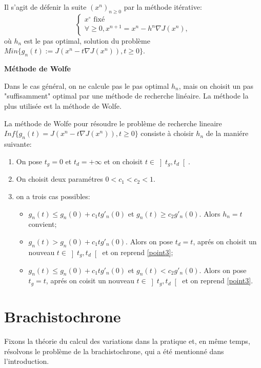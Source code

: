 \documentclass[10pt,a4paper]{article}%
\theoremstyle{theorem}
\theoremstyle{definition}
\begin{document}
			Il s'agit de défenir la suite $(x^n)_{n \ge 0}$ par la méthode itérative:
				\begin{equation}
					\begin{cases*}
						x^\circ \text{ fixé}
						\\
						\forall\ge 0,  x^{n+1}=x^n-h^n\nabla J(x^n),
					\end{cases*}
				\end{equation}
			où $h_n$ est le pas optimal, solution du problème $Min\{g_n(t):=J(x^n-t\nabla J(x^n)), t\ge 0\}$.
			
			\textbf{Méthode de Wolfe}
			
			Dans le cas général, on ne calcule pas le pas optimal $h_n$, mais on choisit un pas "suffisamment" optimal par une méthode de recherche linéaire. La méthode la plus utilisée est la méthode de Wolfe. 
			
			La méthode de Wolfe pour résoudre le problème de recherche lineaire $Inf\{ g_n(t)=J(x^n-t\nabla J(x^n)), t\ge 0\}$ consiste à choisir $h_n$ de la maniére suivante:
			
				\begin{enumerate}
					\item On pose $t_g=0$ et $t_d=+\infty$ et on choisit $t\in \left] t_g,t_d\right[$.
					\item On choisit deux paramétres $0<c_1<c_2<1$.
					\item\label{point3} on a trois cas possibles:
					\begin{itemize}
						\item $g_n(t)\le g_n(0)+c_1tg'_n(0)$ et $g_n(t)\ge c_2g'_n(0)$. Alors $h_n=t$ convient;
						\item $g_n(t)> g_n(0)+c_1tg'_n(0)$. Alors on pose $t_d=t$, aprés on choisit un nouveau $t\in \left]t_g,t_d\right[$ et on reprend \ref{point3};
						\item $g_n(t)\le g_n(0)+c_1tg'_n(0)$ et $g_n(t)< c_2g'_n(0)$. Alors on pose $t_g=t$, aprés  on coisit un nouveau $t \in \left] t_g,t_d\right[$ et on reprend \ref{point3}.
					\end{itemize}
				\end{enumerate}
			\cite{pente}\cite{wolfe}
	
	\section{Brachistochrone}\label{brachistochrone}
	
	Fixons la théorie du calcul des variations dans la pratique et, en même temps, résolvons le problème de la brachistochrone, qui a été mentionné dans l'introduction.
	
\end{document}
